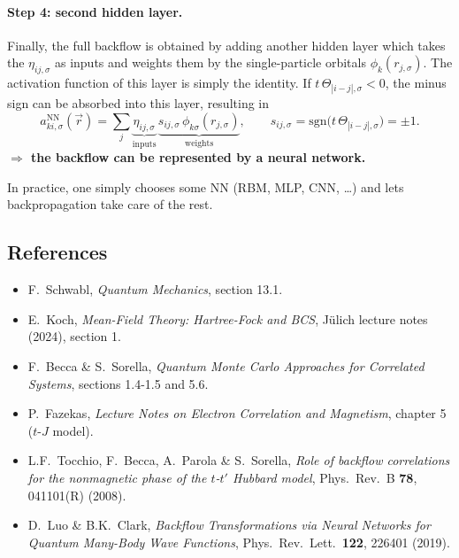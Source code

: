 \documentclass[../../main.tex]{subfiles}
\begin{document}
\paragraph{Step 4: second hidden layer.}
Finally, the full backflow is obtained by adding another hidden layer which takes
the $\eta_{ij,\sigma}$ as inputs and weights them by the single-particle orbitals
$\phi_k(r_{j,\sigma})$. The activation function of this layer is simply the
identity. If $t\,\Theta_{|i-j|,\sigma}<0$, the minus sign can be absorbed into
this layer, resulting in
\begin{equation}
a^{\mathrm{NN}}_{k i,\sigma}(\vec r)=\sum_j
\underbrace{\eta_{ij,\sigma}}_{\text{inputs}}\,
\underbrace{s_{ij,\sigma}\,\phi_{k\sigma}(r_{j,\sigma})}_{\text{weights}},
\qquad
s_{ij,\sigma}=\mathrm{sgn}\big(t\,\Theta_{|i-j|,\sigma}\big)=\pm1 .
\end{equation}
\textbf{$\Rightarrow$ the backflow can be represented by a neural network.}

In practice, one simply chooses some NN (RBM, MLP, CNN, \dots) and lets
backpropagation take care of the rest.

\subsection{References}
\begin{itemize}
\item F.\ Schwabl, \emph{Quantum Mechanics}, section 13.1.
\item E.\ Koch, \emph{Mean-Field Theory: Hartree-Fock and BCS}, J\"ulich lecture
      notes (2024), section 1.
\item F.\ Becca \& S.\ Sorella, \emph{Quantum Monte Carlo Approaches for
      Correlated Systems}, sections 1.4-1.5 and 5.6.
\item P.\ Fazekas, \emph{Lecture Notes on Electron Correlation and Magnetism},
      chapter 5 ($t$-$J$ model).
\item L.F.\ Tocchio, F.\ Becca, A.\ Parola \& S.\ Sorella, \emph{Role of backflow
      correlations for the nonmagnetic phase of the $t$-$t'$ Hubbard model},
      Phys.\ Rev.\ B \textbf{78}, 041101(R) (2008).
\item D.\ Luo \& B.K.\ Clark, \emph{Backflow Transformations via Neural Networks
      for Quantum Many-Body Wave Functions}, Phys.\ Rev.\ Lett.\ \textbf{122},
      226401 (2019).
\end{itemize}
\end{document}
